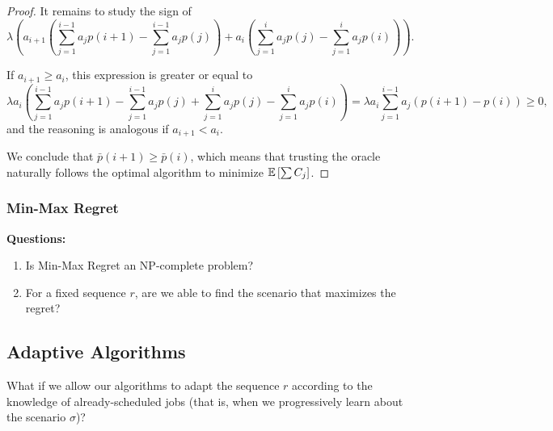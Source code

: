 \documentclass{article}
\begin{document}
\begin{proof}
    It remains to study the sign of
    \[
        \lambda \left(a_{i+1}\left(\sum_{j=1}^{i-1}a_jp(i+1)-\sum_{j=1}^{i-1}a_jp(j)\right)+a_i\left(\sum_{j=1}^{i}a_jp(j)-\sum_{j=1}^{i}a_jp(i)\right)\right).
    \]

    If \(a_{i+1}\ge a_i\), this expression is greater or equal to
    \[
        \lambda a_i \left(\sum_{j=1}^{i-1}a_jp(i+1)-\sum_{j=1}^{i-1}a_jp(j)+\sum_{j=1}^{i}a_jp(j)-\sum_{j=1}^{i}a_jp(i)\right)=\lambda a_i \sum_{j=1}^{i-1} a_j(p(i+1)-p(i))\ge 0,
    \]
    and the reasoning is analogous if \(a_{i+1}<a_i\).

    We conclude that \(\bar{p}(i+1)\ge\bar{p}(i)\), which means that trusting the oracle naturally follows the optimal algorithm to minimize \(\mathbb{E}\left[\sum C_j\right]\).
\end{proof}

\subsubsection{Min-Max Regret}

\textbf{Questions:}
\begin{enumerate}
    \item Is Min-Max Regret an NP-complete problem?
    \item For a fixed sequence \(r\), are we able to find the scenario that maximizes the regret?
\end{enumerate}

\subsection{Adaptive Algorithms}

What if we allow our algorithms to adapt the sequence \(r\) according to the knowledge of already-scheduled jobs (that is, when we progressively learn about the scenario \(\sigma\))?



\end{document}
